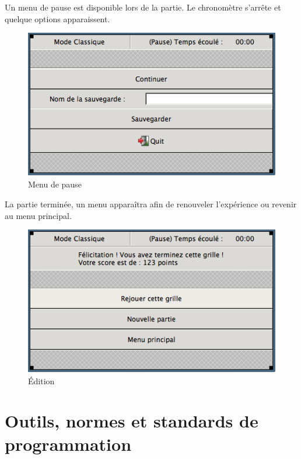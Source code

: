 \documentclass[11pt]{article}
\begin{document}
	\FloatBarrier
	
	Un menu de pause est disponible lors de la partie. Le chronomètre s'arrête et quelque options apparaissent.
	
		\begin{figure}[!ht]
			\centering
			\includegraphics{./IHM/pause.png}
			\caption{Menu de pause}
		\end{figure}
		
	\FloatBarrier
		
	La partie terminée, un menu apparaîtra afin de renouveler l'expérience ou revenir au menu principal.
	
		\begin{figure}[!ht]
			\centering
			\includegraphics{./IHM/fin_partie.png}
			\caption{Édition}
		\end{figure}
		
	\FloatBarrier
%

\newpage

\section{Outils, normes et standards de programmation}
\end{document}
